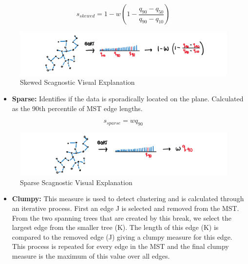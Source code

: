 \[s_{skewed} = 1-w(1-\frac{q_{90}-{q_{50}}}{q_{90}-q_{10}})\]

\begin{Schunk}
\begin{figure}
\includegraphics[width=1\linewidth,height=0.2\textheight]{figures/drawskewed} \caption[Skewed Scagnostic Visual Explanation]{Skewed Scagnostic Visual Explanation}\label{fig:skewedscag}
\end{figure}
\end{Schunk}

\begin{itemize}
\tightlist
\item
  \textbf{Sparse:} Identifies if the data is sporadically located on the
  plane. Calculated as the 90th percentile of MST edge lengths.
\end{itemize}

\[s_{sparse}= wq_{90}\]

\begin{Schunk}
\begin{figure}
\includegraphics[width=1\linewidth,height=0.2\textheight]{figures/drawsparse} \caption[Sparse Scagnostic Visual Explanation]{Sparse Scagnostic Visual Explanation}\label{fig:sparsescag}
\end{figure}
\end{Schunk}

\begin{itemize}
\tightlist
\item
  \textbf{Clumpy:} This measure is used to detect clustering and is
  calculated through an iterative process. First an edge J is selected
  and removed from the MST. From the two spanning trees that are created
  by this break, we select the largest edge from the smaller tree (K).
  The length of this edge (K) is compared to the removed edge (J) giving
  a clumpy measure for this edge. This process is repeated for every
  edge in the MST and the final clumpy measure is the maximum of this
  value over all edges.
\end{itemize}

